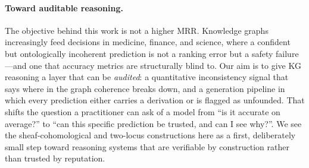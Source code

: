 \paragraph{Toward auditable reasoning.}
The objective behind this work is not a higher MRR. Knowledge graphs
increasingly feed decisions in medicine, finance, and science, where a
confident but ontologically incoherent prediction is not a ranking error
but a safety failure---and one that accuracy metrics are structurally
blind to. Our aim is to give KG reasoning a layer that can be
\emph{audited}: a quantitative inconsistency signal that says where in
the graph coherence breaks down, and a generation pipeline in which every
prediction either carries a derivation or is flagged as unfounded. That
shifts the question a practitioner can ask of a model from ``is it
accurate on average?'' to ``can this specific prediction be trusted, and
can I see why?''. We see the sheaf-cohomological and two-locus
constructions here as a first, deliberately small step toward reasoning
systems that are verifiable by construction rather than trusted by
reputation.
